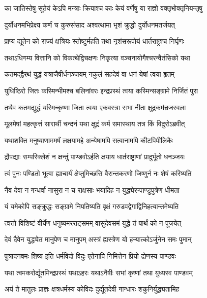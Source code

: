 \twolineshloka
{का जातिस्तेषु सूतेयं केऽपि मन्त्राः क्रियाश्च काः}
{केयं वर्णेषु या राज्ञो वक्तृभोक्तृनियन्तृषु}



\twolineshloka
{दुर्योधनमभिप्रेक्ष्य कर्णं च कुरुसंसाद}
{अश्वत्थामा भृशं क्रुद्धो दुर्योधनमतर्जयत्}


\twolineshloka
{प्राप्य द्यूतेन को राज्यं क्षत्रियः स्तोष्टुर्महति}
{तथा नृशंसरूपोयं धार्तराष्ट्रश्च निर्घृणः}


\twolineshloka
{तथाऽधिगम्य वित्तानि को विकत्थेद्विचक्षणः}
{निकृत्या वञ्चनायोगैश्चरन्वैतंसिको यथा}


\twolineshloka
{कतमद्द्वैरथं युद्धं यत्राजैषीर्धनञ्जयम्}
{नकुलं सहदेवं वा धनं येषां त्वया हृतम्}


\twolineshloka
{युधिष्ठिरो जितः कस्मिन्भीमश्च बलिनांवरः}
{इन्द्रप्रस्थं त्वया कस्मिन्सङ्ग्रामे निर्जितं पुरा}


\twolineshloka
{तथैव कतमद्युद्धं यस्मिन्कृष्णा जिता त्वया}
{एकवस्त्रा सभां नीता क्षुद्रकर्मन्रजस्वला}


\twolineshloka
{मूलमेषां महत्कृत्तं सारार्थी चन्दनं यथा}
{क्षुद्रं कर्म समास्थाय तत्र किं विदुरोऽब्रवीत्}


\twolineshloka
{यथाशक्ति मनुष्याणाममर्षं लक्षयामहे}
{अन्येषामपि सत्वानामपि कीटपिपीलिकैः}


\twolineshloka
{द्रौपद्याः सम्परिक्लेशं न क्षन्तुं पाण्डवोऽर्हति}
{क्षयाय धार्तराष्ट्राणां प्रादुर्भूतो धनञ्जयः}


\twolineshloka
{त्वं पुनः पण्डितो भूत्वा ह्याचार्यं क्षेप्तुमिच्छसि}
{वैरान्तकरणो जिष्णुर्न नः शेषं करिष्यति}


\twolineshloka
{नैव देवा न गन्धर्वा नासुरा न च राक्षसाः}
{भयादिह न युद्ध्येरन्पाण्डुपुत्रेण धीमता}


\twolineshloka
{यं यमेकोपि सङ्क्रुद्धः सङ्ग्रामे निपतिष्यति}
{वृक्षं गरुडवद्वेगाद्विनिहत्यान्तमेष्यति}


\twolineshloka
{त्वत्तो विशिष्टं वीर्येण धनुष्यमरराट्समम्}
{वासुदेवसमं युद्धे तं पार्थं को न पूजयेत्}


\twolineshloka
{देवं दैवेन युद्ध्येत मानुपेण च मानुपम्}
{अस्त्रं ह्यस्त्रेण यो हन्यात्कोऽर्जुनेन समः पुमान्}


\twolineshloka
{पुत्रादनवमः शिष्य इति धर्मविदो विदुः}
{एतेनापि निमित्तेन प्रियो द्रोणस्य पाण्डवः}


\twolineshloka
{यथा त्वमकरोर्द्यूतमिन्द्रप्रस्थं यथाऽहरः}
{यथाऽनैषीः सभां कृष्णां तथा युध्यस्व पाण्डवम्}


\twolineshloka
{अयं ते मातुलः प्राज्ञः क्षत्रधर्मस्य कोविदः}
{दुर्द्यूतदेवी गान्धारः शकुनिर्युद्ध्यतामिह}


